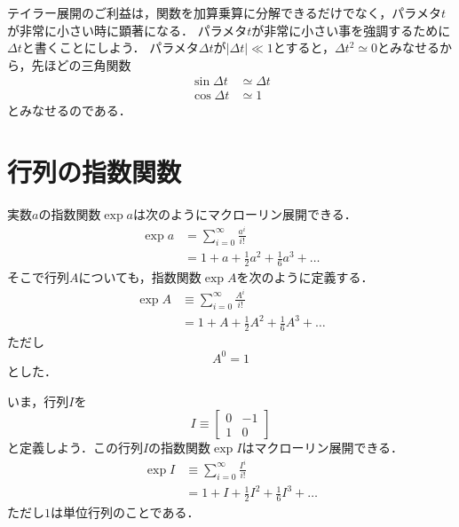 \documentclass{jsbook}
\begin{document}
テイラー展開のご利益は，関数を加算乗算に分解できるだけでなく，パラメタ$t$が非常に小さい時に顕著になる．
パラメタ$t$が非常に小さい事を強調するために$\Delta t$と書くことにしよう．
パラメタ$\Delta t$が$|\Delta t|\ll1$とすると，$\Delta t^2\simeq0$とみなせるから，先ほどの三角関数
\begin{align}
\sin\Delta t&\simeq\Delta t\\
\cos\Delta t&\simeq1
\end{align}
とみなせるのである．

\section{行列の指数関数}

実数$a$の指数関数$\exp a$は次のようにマクローリン展開できる．
\begin{align}
\exp a&=\sum_{i=0}^\infty\frac{a^i}{i!}\\
&=1+a+\frac{1}{2}a^2+\frac{1}{6}a^3+\dots
\end{align}
そこで行列$A$についても，指数関数$\exp A$を次のように定義する．
\begin{align}
\exp A&\equiv\sum_{i=0}^\infty\frac{A^i}{i!}\\
&=1+A+\frac{1}{2}A^2+\frac{1}{6}A^3+\dots
\end{align}
ただし
\begin{equation}
A^0=1
\end{equation}
とした．

いま，行列$I$を
\begin{equation}
I\equiv\begin{bmatrix}0&-1\\1&0\end{bmatrix}
\end{equation}
と定義しよう．この行列$I$の指数関数$\exp I$はマクローリン展開できる．
\begin{align}
\exp I&\equiv\sum_{i=0}^\infty\frac{I^i}{i!}\\
&=1+I+\frac{1}{2}I^2+\frac{1}{6}I^3+\dots
\end{align}
ただし$1$は単位行列のことである．
\end{document}
